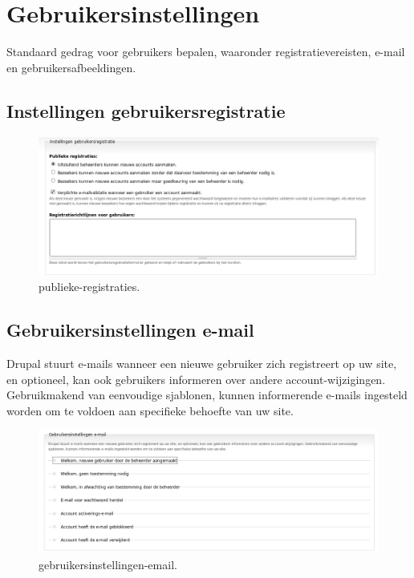 \section{Gebruikersinstellingen} 
    Standaard gedrag voor gebruikers bepalen, waaronder registratievereisten, e-mail en gebruikersafbeeldingen.
\subsection{Instellingen gebruikersregistratie}  
\begin{figure}[!h]
    \centering
   \includegraphics[scale=0.3,angle=0]{publieke-registraties}
   \caption{publieke-registraties.\label{white}}
 \end{figure} 
\subsection{Gebruikersinstellingen e-mail} 
Drupal stuurt e-mails wanneer een nieuwe gebruiker zich registreert op uw site,
 en optioneel, kan ook gebruikers informeren over andere account-wijzigingen. 
 Gebruikmakend van eenvoudige sjablonen, kunnen informerende e-mails 
 ingesteld worden om te voldoen aan specifieke behoefte van uw site. 
 \begin{figure}[!h]
    \centering
   \includegraphics[scale=0.3,angle=0]{gebruikersinstellingen-email}
   \caption{gebruikersinstellingen-email.\label{white}}
 \end{figure} 
    
